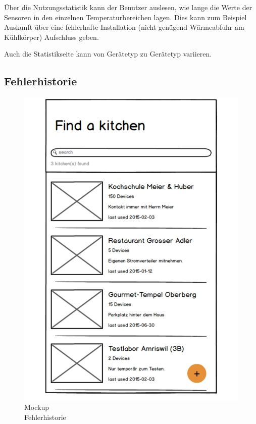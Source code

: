 Über die Nutzungsstatistik kann der Benutzer auslesen, wie lange die Werte der Sensoren in den einzelnen Temperaturbereichen lagen. Dies kann zum Beispiel Auskunft über eine fehlerhafte Installation (nicht genügend Wärmeabfuhr am Kühlkörper) Aufschluss geben.

Auch die Statistikseite kann von Gerätetyp zu Gerätetyp variieren.

\WFclear
\vspace{2cm}

\subsection{Fehlerhistorie}
\label{subsec:Fehlerhistorie}

\begin{figure}
	\begin{center}
        \vspace{-1cm}
		\includegraphics[page=8,trim=0 0 0 0,clip,scale=0.21]{uiux/res/mockups}
		\caption{Mockup\\Fehlerhistorie}
		\label{abb:mockDeviceErrors}
	\end{center}
\end{figure}

